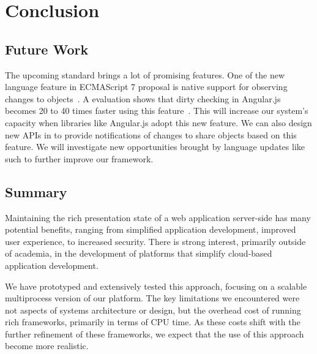 \chapter{Conclusion}

\section{Future Work}

The upcoming \js standard brings a lot of promising features.  One of the new
language feature in ECMAScript 7 proposal is native support for observing
changes to objects~\cite{jsobserveprop}. A evaluation shows that dirty
checking in Angular.js becomes 20 to 40 times faster using this
feature~\cite{angularjsspeedup}. This will increase our system's capacity when
libraries like Angular.js  adopt this new feature. We can also design new APIs
in \appins to provide notifications of changes to share objects based on this
feature. We will investigate new opportunities brought by language updates
like such to further improve our framework.

% 




\section{Summary}

Maintaining the rich presentation state  of a web application server-side has
many potential benefits, ranging from simplified application development,
improved user experience, to increased security.  There is strong interest,
primarily outside of academia, in the development of platforms that simplify
cloud-based  application development.

We have prototyped and extensively tested this approach, focusing on a
scalable multiprocess version of our \cb{} platform. The key limitations we
encountered were not aspects of systems architecture or design,  but the
overhead cost of running rich frameworks, primarily in terms of CPU time.   As
these costs shift with the further refinement of these frameworks, we expect
that the use of this approach become more realistic.
